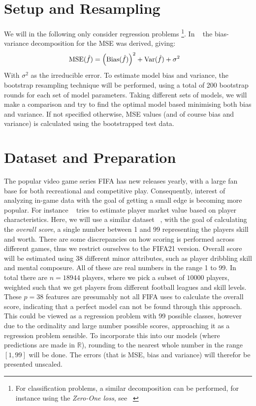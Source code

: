         \section{Setup and Resampling}
        We will in the following only consider regression problems \footnote{For classification problems, a similar decomposition can be performed, for instance using the \textit{Zero-One loss}, see ~\citep{zero_one_loss}}. In ~\citep{Project1} the bias-variance decomposition for the MSE was derived, giving:
        \begin{align}
            \operatorname{MSE}(\hat{f}) &= \left(\operatorname{Bias}(\hat{f})\right)^2 + \operatorname{Var}(\hat{f}) + \sigma^2
        \end{align}
        With $\sigma^2$ as the irreducible error. To estimate model bias and variance, the bootstrap resampling technique will be performed, using a total of 200 bootstrap rounds for each set of model parameters. Taking different sets of models, we will make a comparison and try to find the optimal model based minimising both bias and variance. If not specified otherwise, MSE values (and of course bias and variance) is calculated using the bootstrapped test data. 

    \section{Dataset and Preparation}
        The popular video game series FIFA has new releases yearly, with a large fan base for both recreational and competitive play. Consequently, interest of analyzing in-game data with the goal of getting a small edge is becoming more popular. For instance ~\citep{fifa21playersvalue} tries to estimate player market value based on player characteristics. Here, we will use a similar dataset ~\citep{fifa21_data}, with the goal of calculating the \textit{overall score}, a single number between 1 and 99 representing the players skill and worth. There are some discrepancies on how scoring is performed across different games, thus we restrict ourselves to the FIFA21 version. Overall score will be estimated using 38 different minor attributes, such as player dribbling skill and mental composure. All of these are real numbers in the range 1 to 99. In total there are $n = 18944$ players, where we pick a subset of $10000$ players, weighted such that we get players from different football leagues and skill levels. These $p = 38$ features are presumably not all FIFA uses to calculate the overall score, indicating that a perfect model can not be found through this approach. This could be viewed as a regression problem with 99 possible classes, however due to the ordinality and large number possible scores, approaching it as a regression problem sensible. To incorporate this into our models (where predictions are made in $\mathbb{R}$), rounding to the nearest whole number in the range $[1,99]$ will be done. The errors (that is MSE, bias and variance) will therefor be presented unscaled. 
        
